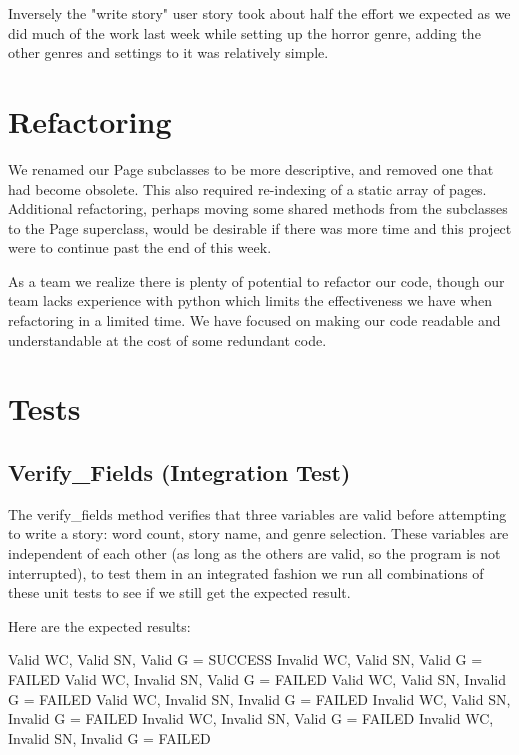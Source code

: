 \documentclass[12pt]{article}
\begin{document}
Inversely the "write story" user story took about half the effort we expected as we did much of the work last week while setting up the horror genre, adding the other genres and settings to it was relatively simple.

\section{Refactoring}

We renamed our Page subclasses to be more descriptive, and removed one that had become obsolete. This also required re-indexing of a static array of pages. Additional refactoring, perhaps moving some shared methods from the subclasses to the Page superclass, would be desirable if there was more time and this project were to continue past the end of this week. 

As a team we realize there is plenty of potential to refactor our code, though  our team lacks experience with python which limits the effectiveness we have when refactoring in a limited time. We have focused on making our code readable and understandable at the cost of some redundant code.

\section{Tests}

\subsection{Verify\_Fields (Integration Test)}

The verify\_fields method verifies that three variables are valid before attempting to write a story: word count, story name, and genre selection. These variables are independent of each other (as long as the others are valid, so the program is not interrupted), to test them in an integrated fashion we run all combinations of these unit tests to see if we still get the expected result.

Here are the expected results:\newline

Valid WC, Valid SN, Valid G = SUCCESS\newline
Invalid WC, Valid SN, Valid G = FAILED\newline
Valid WC, Invalid SN, Valid G = FAILED\newline
Valid WC, Valid SN, Invalid G = FAILED\newline
Valid WC, Invalid SN, Invalid G = FAILED\newline
Invalid WC, Valid SN, Invalid G = FAILED\newline
Invalid WC, Invalid SN, Valid G = FAILED\newline
Invalid WC, Invalid SN, Invalid G = FAILED\newline
\end{document}
